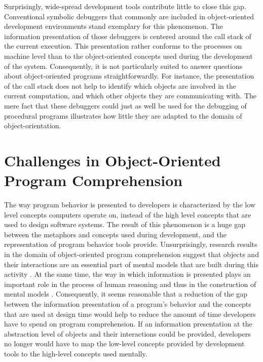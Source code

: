 Surprisingly, wide-spread development tools contribute little to close this gap.
Conventional symbolic debuggers that commonly are included in object-oriented development environments stand exemplary for this phenomenon.
The information presentation of those debuggers is centered around the call stack of the current execution.
This presentation rather conforms to the processes on machine level than to the object-oriented concepts used during the development of the system.
Consequently, it is not particularly suited to answer questions about object-oriented programs straightforwardly.
For instance, the presentation of the call stack does not help to identify which objects are involved in the current computation, and which other objects they are communicating with.
The mere fact that these debuggers could just as well be used for the debugging of procedural programs illustrates how little they are adapted to the domain of object-orientation.

\section[Challenges in Object-Oriented Program Comprehension]{Challenges in Object-Oriented Program Comprehension%
}
The way program behavior is presented to developers is characterized by the low level concepts computers operate on, instead of the high level concepts that are used to design software systems.
The result of this phenomenon is a huge gap between the metaphors and concepts used during development, and the representation of program behavior tools provide.
Unsurprisingly, research results in the domain of object-oriented program comprehension suggest that objects and their interactions are an essential part of mental models that are built during this activity \cite{burkhardt_mental_1997}.
At the same time, the way in which information is presented plays an important role in the process of human reasoning and thus in the construction of mental models \cite{diehl_software_2007}.
Consequently, it seems reasonable that a reduction of the gap between the information presentation of a program's behavior and the concepts that are used at design time would help to reduce the amount of time developers have to spend on program comprehension.
If an information presentation at the abstraction level of objects and their interactions could be provided, developers no longer would have to map the low-level concepts provided by development tools to the high-level concepts used mentally.

